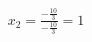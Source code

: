 \documentclass[preview]{standalone}
\begin{document}
\begin{align*}
x_2 = \frac{-\frac{10}{3}}{-\frac{10}{3}} = 1
\end{align*}
\end{document}
